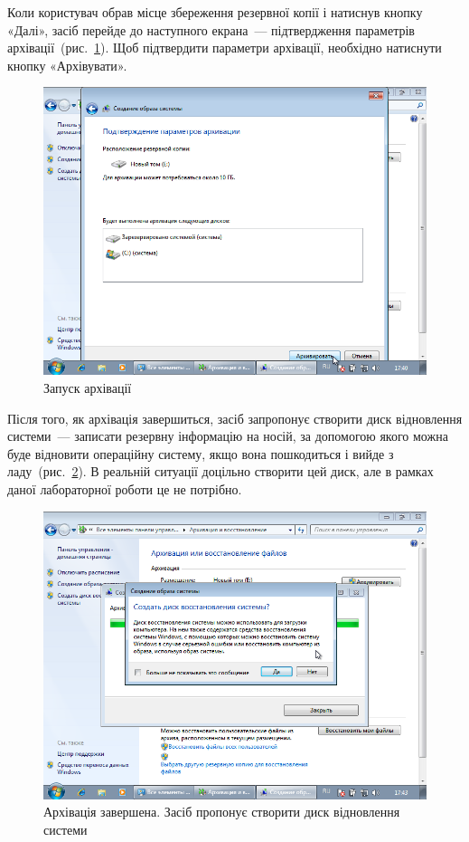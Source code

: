 \documentclass[
	a4paper,
	oneside,
	BCOR = 10mm,
	DIV = 12,
	12pt,
	headings = normal,
]{scrartcl}
\begin{document}
				Коли користувач обрав місце збереження резервної копії і натиснув кнопку «Далі», засіб перейде до наступного екрана~— підтвердження параметрів архівації~(рис.~\ref{fig:02-system-img-03}). Щоб підтвердити параметри архівації, необхідно натиснути кнопку «Архівувати».

				\begin{figure}[!htbp]
					\centering
					\includegraphics[height=12\baselineskip]{./assets/y04s01-infosec-lab-01-03-p09.png}
					\caption{Запуск архівації}
					\label{fig:02-system-img-03}
				\end{figure}

				Після того, як архівація завершиться, засіб запропонує створити диск відновлення системи~— записати резервну інформацію на носій, за допомогою якого можна буде відновити операційну систему, якщо вона пошкодиться і вийде з ладу~(рис.~\ref{fig:02-system-img-04}). В реальній ситуації доцільно створити цей диск, але в рамках даної лабораторної роботи це не потрібно.

				\begin{figure}[!htbp]
					\centering
					\includegraphics[height=12\baselineskip]{./assets/y04s01-infosec-lab-01-03-p11.png}
					\caption{Архівація завершена. Засіб пропонує створити диск відновлення системи}
					\label{fig:02-system-img-04}
				\end{figure}
\end{document}
